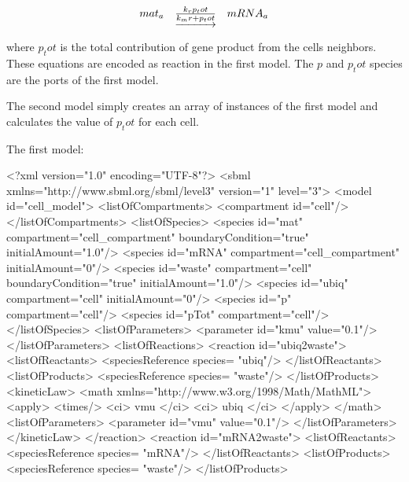 \documentclass{cekarticle}
\begin{document}
\begin{equation*}
  \begin{array}{@{}ccc@{}}
    mat_a & \underrightarrow{\frac{k_r p_tot}{k_mr + p_tot}} & mRNA_a
  \end{array}
\end{equation*}

where $p_tot$ is the total contribution of gene product from the cells
neighbors. These equations are encoded as reaction in the first model.
The $p$ and $p_tot$ species are the ports of the first model.

The second model simply creates an array of instances of the first model
and calculates the value of $p_tot$ for each cell.

The first model:
\begin{example}
<?xml version="1.0" encoding="UTF-8"?>
<sbml xmlns="http://www.sbml.org/sbml/level3" version="1" level="3">
<model id="cell_model">
    <listOfCompartments>
        <compartment id="cell"/>
    </listOfCompartments>
    <listOfSpecies>
        <species id="mat" compartment="cell_compartment" boundaryCondition="true" initialAmount="1.0"/>
        <species id="mRNA" compartment="cell_compartment" initialAmount="0"/>
        <species id="waste" compartment="cell" boundaryCondition="true" initialAmount="1.0"/>
        <species id="ubiq" compartment="cell" initialAmount="0"/>
        <species id="p" compartment="cell"/>
        <species id="pTot" compartment="cell"/>
    </listOfSpecies>
    <listOfParameters>
        <parameter id="kmu" value="0.1"/>
    </listOfParameters>
    <listOfReactions>
        <reaction id="ubiq2waste">
            <listOfReactants>
                <speciesReference species= "ubiq"/>
            </listOfReactants>
            <listOfProducts>
                <speciesReference species= "waste"/>
            </listOfProducts>
            <kineticLaw>
                <math xmlns="http://www.w3.org/1998/Math/MathML">
                    <apply>
                        <times/>
                        <ci> vmu </ci>
                        <ci> ubiq </ci>
                    </apply>
                </math>
                <listOfParameters>
                    <parameter id="vmu" value="0.1"/>
                </listOfParameters>
            </kineticLaw>
        </reaction>
        <reaction id="mRNA2waste">
            <listOfReactants>
                <speciesReference species= "mRNA"/>
            </listOfReactants>
            <listOfProducts>
                <speciesReference species= "waste"/>
            </listOfProducts>

\end{example}
\end{document}
